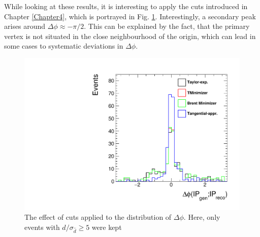 While looking at these results, it is interesting to apply the cuts introduced in Chapter \ref{Chapter4}, which is portrayed in Fig. \ref{fig:deltaphicut}. Interestingly, a secondary peak arises around $\Delta\phi \approx -\pi/2$. This can be explained by the fact, that the primary vertex is not situated in the close neighbourhood of the origin, which can lead in some cases to systematic deviations in $\Delta\phi$.
\begin{figure}[h]
	\centering
	\includegraphics[width=0.7\linewidth]{Figures/deltaPhi_cut}
	\caption{The effect of cuts applied to the distribution of $\Delta\phi$. Here, only events with $d/\sigma_{\hat{d}} \geq 5$ were kept}
	\label{fig:deltaphicut}
\end{figure}

